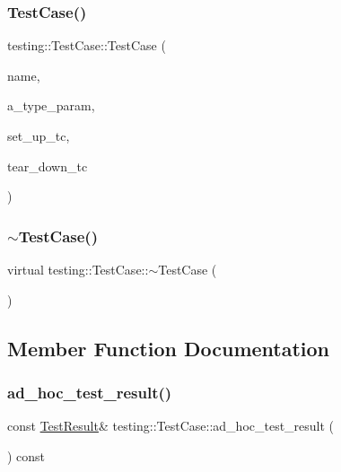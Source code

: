 \subsubsection{\texorpdfstring{TestCase()}{TestCase()}}
{\footnotesize\ttfamily testing\+::\+Test\+Case\+::\+Test\+Case (\begin{DoxyParamCaption}\item[{const char $\ast$}]{name,  }\item[{const char $\ast$}]{a\+\_\+type\+\_\+param,  }\item[{\mbox{\hyperlink{classtesting_1_1_test_a5f2a051d1d99c9b784c666c586186cf9}{Test\+::\+Set\+Up\+Test\+Case\+Func}}}]{set\+\_\+up\+\_\+tc,  }\item[{\mbox{\hyperlink{classtesting_1_1_test_aa0f532e93b9f3500144c53f31466976c}{Test\+::\+Tear\+Down\+Test\+Case\+Func}}}]{tear\+\_\+down\+\_\+tc }\end{DoxyParamCaption})}

\mbox{\label{classtesting_1_1_test_case_ae8afec89feb954cc84317bd92c9b1bbe}} 
\subsubsection{\texorpdfstring{$\sim$TestCase()}{~TestCase()}}
{\footnotesize\ttfamily virtual testing\+::\+Test\+Case\+::$\sim$\+Test\+Case (\begin{DoxyParamCaption}{ }\end{DoxyParamCaption})\hspace{0.3cm}{\ttfamily [virtual]}}



\subsection{Member Function Documentation}
\mbox{\label{classtesting_1_1_test_case_a6d5fc5003bc3352f3ddae7dadc6d2364}} 
\subsubsection{\texorpdfstring{ad\_hoc\_test\_result()}{ad\_hoc\_test\_result()}}
{\footnotesize\ttfamily const \mbox{\hyperlink{classtesting_1_1_test_result}{Test\+Result}}\& testing\+::\+Test\+Case\+::ad\+\_\+hoc\+\_\+test\+\_\+result (\begin{DoxyParamCaption}{ }\end{DoxyParamCaption}) const\hspace{0.3cm}{\ttfamily [inline]}}

